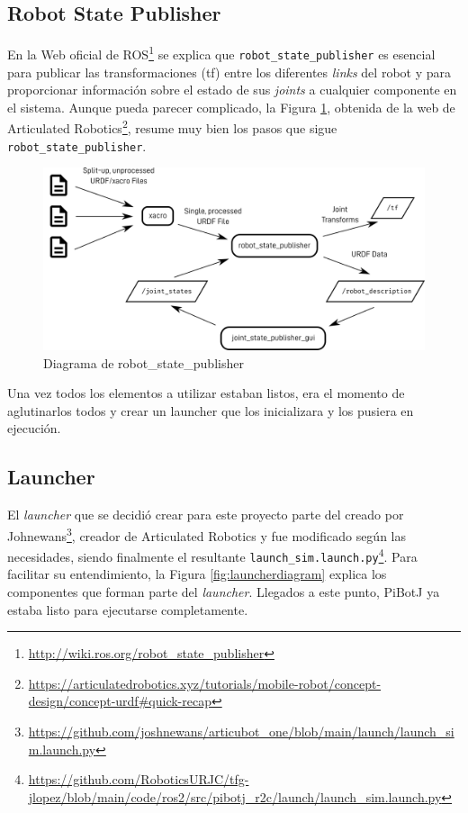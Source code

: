 \subsection{Robot State Publisher}
\label{subsec:robotstatepublisher}

En la Web oficial de ROS\footnote{\url{http://wiki.ros.org/robot_state_publisher}} se explica que \verb|robot_state_publisher| es esencial para publicar las transformaciones (tf) entre los diferentes \textit{links} del robot y para proporcionar información sobre el estado de sus \textit{joints} a cualquier componente en el sistema. Aunque pueda parecer complicado, la Figura \ref{fig:rsp}, obtenida de la web de Articulated Robotics\footnote{\url{https://articulatedrobotics.xyz/tutorials/mobile-robot/concept-design/concept-urdf\#quick-recap}}, resume muy bien los pasos que sigue \verb|robot_state_publisher|.

 \begin{figure} [h!]
	\begin{center}
		\includegraphics[width=12cm]{figs/cap6/rsp.png}
	\end{center}
	\caption{Diagrama de robot\_state\_publisher}
	\label{fig:rsp}
\end{figure}

Una vez todos los elementos a utilizar estaban listos, era el momento de aglutinarlos todos y crear un launcher que los inicializara y los pusiera en ejecución.

\subsection{Launcher}
\label{subsec:launcher}

El \textit{launcher} que se decidió crear para este proyecto parte del creado por Johnewans\footnote{\url{https://github.com/joshnewans/articubot_one/blob/main/launch/launch_sim.launch.py}}, creador de Articulated Robotics y fue modificado según las necesidades, siendo finalmente el resultante \verb|launch_sim.launch.py|\footnote{\url{https://github.com/RoboticsURJC/tfg-jlopez/blob/main/code/ros2/src/pibotj_r2c/launch/launch_sim.launch.py}}. Para facilitar su entendimiento, la Figura \ref{fig:launcherdiagram} explica los componentes que forman parte del \textit{launcher}. Llegados a este punto, PiBotJ ya estaba listo para ejecutarse completamente.


